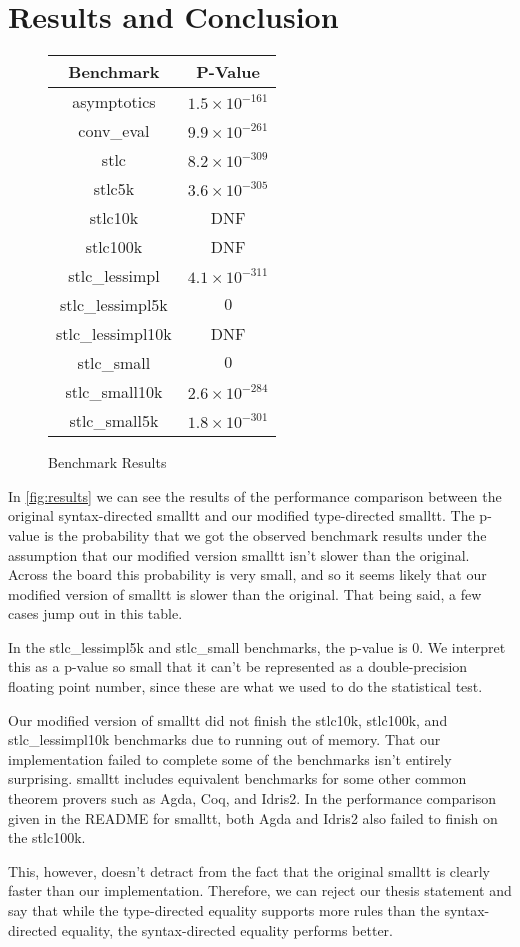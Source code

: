 \section{Results and Conclusion}

\begin{figure}[!htb]
  \centering
  \begin{tabular}{|c | c|}
    \hline
    Benchmark & P-Value
    \\ \hline
    asymptotics & $1.5 \times 10^{-161}$
    \\ \hline
    conv\_eval & $9.9 \times 10^{-261}$
    \\ \hline
    stlc & $8.2 \times 10^{-309}$
    \\ \hline
    stlc5k & $3.6 \times 10^{-305}$
    \\ \hline
    stlc10k & DNF
    \\ \hline
    stlc100k & DNF
    \\ \hline
    stlc\_lessimpl & $4.1 \times 10^{-311}$
    \\ \hline
    stlc\_lessimpl5k & $0$
    \\ \hline
    stlc\_lessimpl10k & DNF
    \\ \hline
    stlc\_small & $0$
    \\ \hline
    stlc\_small10k & $2.6 \times 10^{-284}$
    \\ \hline
    stlc\_small5k & $1.8 \times 10^{-301}$
    \\ \hline
  \end{tabular}
  \caption{Benchmark Results}
  \label{fig:results}
\end{figure}

In \autoref{fig:results} we can see the results of the performance comparison between the original syntax-directed smalltt and our modified type-directed smalltt.
The p-value is the probability that we got the observed benchmark results under the assumption that our modified version smalltt isn't slower than the original.
Across the board this probability is very small, and so it seems likely that our modified version of smalltt is slower than the original.
That being said, a few cases jump out in this table.

In the stlc\_lessimpl5k and stlc\_small benchmarks, the p-value is 0.
We interpret this as a p-value so small that it can't be represented as a double-precision floating point number, since these are what we used to do the statistical test.

Our modified version of smalltt did not finish the stlc10k, stlc100k, and stlc\_lessimpl10k benchmarks due to running out of memory.
That our implementation failed to complete some of the benchmarks isn't entirely surprising.
smalltt includes equivalent benchmarks for some other common theorem provers such as Agda, Coq, and Idris2.
In the performance comparison given in the README for smalltt, both Agda and Idris2 also failed to finish on the stlc100k.

This, however, doesn't detract from the fact that the original smalltt is clearly faster than our implementation.
Therefore, we can reject our thesis statement and say that while the type-directed equality supports more rules than the syntax-directed equality, the syntax-directed equality performs better.


